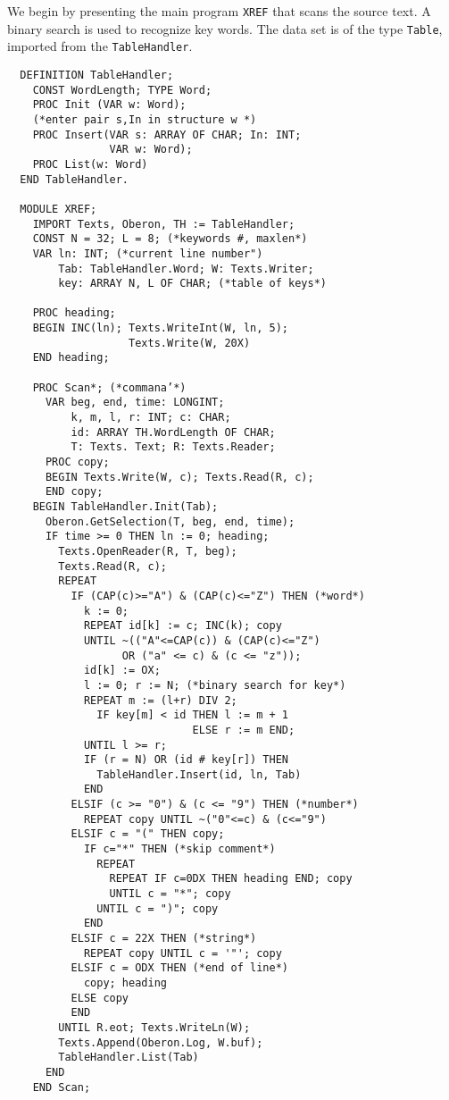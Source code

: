 We begin by presenting the main program \verb|XREF| that scans the source text. A binary search is used
to recognize key words. The data set is of the type \verb|Table|, imported from the \verb|TableHandler|.
\begin{verbatim}
  DEFINITION TableHandler;
    CONST WordLength; TYPE Word;
    PROC Init (VAR w: Word);
    (*enter pair s,In in structure w *)
    PROC Insert(VAR s: ARRAY OF CHAR; In: INT;
                VAR w: Word);
    PROC List(w: Word)
  END TableHandler.
 
  MODULE XREF;
    IMPORT Texts, Oberon, TH := TableHandler;
    CONST N = 32; L = 8; (*keywords #, maxlen*)
    VAR ln: INT; (*current line number")
        Tab: TableHandler.Word; W: Texts.Writer;
        key: ARRAY N, L OF CHAR; (*table of keys*)
 
    PROC heading;
    BEGIN INC(ln); Texts.WriteInt(W, ln, 5);
                   Texts.Write(W, 20X)
    END heading;
 
    PROC Scan*; (*commana’*)
      VAR beg, end, time: LONGINT;
          k, m, l, r: INT; c: CHAR;
          id: ARRAY TH.WordLength OF CHAR;
          T: Texts. Text; R: Texts.Reader;
      PROC copy;
      BEGIN Texts.Write(W, c); Texts.Read(R, c);
      END copy;
    BEGIN TableHandler.Init(Tab);
      Oberon.GetSelection(T, beg, end, time);
      IF time >= 0 THEN ln := 0; heading;
        Texts.OpenReader(R, T, beg);
        Texts.Read(R, c);
        REPEAT
          IF (CAP(c)>="A") & (CAP(c)<="Z") THEN (*word*)
            k := 0;
            REPEAT id[k] := c; INC(k); copy
            UNTIL ~(("A"<=CAP(c)) & (CAP(c)<="Z")
                  OR ("a" <= c) & (c <= "z"));
            id[k] := OX;
            l := 0; r := N; (*binary search for key*)
            REPEAT m := (l+r) DIV 2;
              IF key[m] < id THEN l := m + 1
                             ELSE r := m END;
            UNTIL l >= r;
            IF (r = N) OR (id # key[r]) THEN
              TableHandler.Insert(id, ln, Tab)
            END
          ELSIF (c >= "0") & (c <= "9") THEN (*number*)
            REPEAT copy UNTIL ~("0"<=c) & (c<="9")
          ELSIF c = "(" THEN copy;
            IF c="*" THEN (*skip comment*)
              REPEAT
                REPEAT IF c=0DX THEN heading END; copy
                UNTIL c = "*"; copy
              UNTIL c = ")"; copy
            END
          ELSIF c = 22X THEN (*string*)
            REPEAT copy UNTIL c = '"'; copy
          ELSIF c = ODX THEN (*end of line*)
            copy; heading
          ELSE copy
          END
        UNTIL R.eot; Texts.WriteLn(W);
        Texts.Append(Oberon.Log, W.buf);
        TableHandler.List(Tab)
      END
    END Scan;


\end{verbatim}
